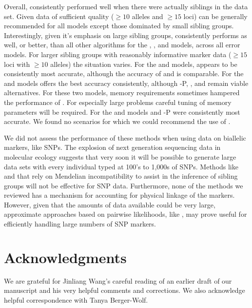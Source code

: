 Overall, \colony{} consistently performed well when
there were actually siblings in the data set.  
Given data of sufficient quality ($\geq 10$ alleles and $\geq 15$ loci)
\prt{} can be generally recommended for 
all models except those dominated by small sibling groups. Interestingly, given it's emphasis on large 
sibling groups, \prt{} consistently performs as well, or better, than all other algorithms for the \nosibs{}, 
\allhalf{}, and \allpathalf{} models, across all error models. 
For larger sibling groups with reasonably informative marker data
($\geq 15$ loci with $\geq 10$ alleles) the situation varies. For 
the \onelargenoh{} and \onelargewh{} models, \prt{} appears to be consistently 
most accurate, although the accuracy of \colony{} 
and \familyfinder{} is comparable. For the \slfsgnoh{} and \slfsgwh{} models \colony{} offers the best accuracy consistently, although 
\colony-P, \prt, and \familyfinder{} remain viable alternatives. For these two models, memory requirements sometimes hampered the 
performance of \prt{}. For especially large problems careful tuning of memory parameters will be required. 
For the \sfsnoh{} and  \sfswh{} models \colony{} and \colony-P were consistently most accurate.   
We found no scenarios for which we could recommend the use of \kinalyzer{}.

We did not assess the performance of these methods when using data on biallelic
markers, like SNPs.  The explosion of next generation sequencing data 
in molecular ecology suggests that very soon it will be possible to 
generate large data sets with every individual typed at 100's to 1,000s
of SNPs.  Methods like \prt{} and \kinalyzer{} that rely on Mendelian 
incompatibility to assist in the inference of sibling groups will not
be effective for SNP data. Furthermore, none of the methods we reviewed 
has a mechanism for accounting for physical linkage of the markers.
However, given that the amounts of data available
could be very large, approximate approaches based on pairwise likelihoods,
like \familyfinder{}, may prove useful for efficiently handling 
large numbers of SNP markers.




\section*{Acknowledgments}
We are grateful for Jinliang Wang's careful reading of an earlier draft of our manuscript and his very helpful
comments and corrections.  We also acknowledge helpful correspondence with Tanya Berger-Wolf.
